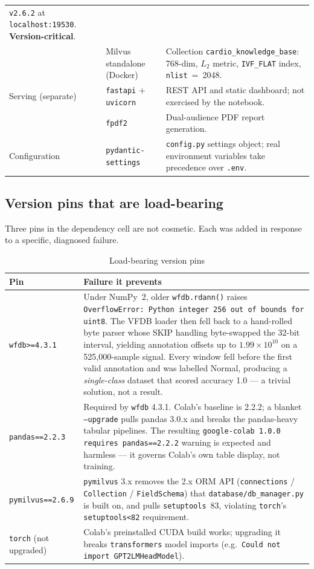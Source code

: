 \documentclass[11pt,a4paper]{article}
\newcommand{\code}[1]{\texttt{\small #1}}
\begin{document}
\begin{longtable}{@{}p{2.9cm}p{4.1cm}p{8.3cm}@{}}
\code{v2.6.2} at \code{localhost:19530}. \textbf{Version-critical}.\\
& Milvus standalone (Docker) & Collection
\code{cardio\_knowledge\_base}: 768-dim, $L_2$ metric, \code{IVF\_FLAT}
index, \code{nlist}~=~2048.\\
\addlinespace
Serving (separate) & \code{fastapi} + \code{uvicorn} & REST API and static
dashboard; not exercised by the notebook.\\
& \code{fpdf2} & Dual-audience PDF report generation.\\
\addlinespace
Configuration & \code{pydantic-settings} & \code{config.py} settings object;
real environment variables take precedence over \code{.env}.\\
\end{longtable}

\subsection{Version pins that are load-bearing}
\label{sec:pins}

Three pins in the dependency cell are not cosmetic. Each was added in
response to a specific, diagnosed failure.

\begin{table}[!ht]
\centering
\caption{Load-bearing version pins}
\label{tab:pins}
\small
\begin{tabular}{@{}p{3.0cm}p{11.8cm}@{}}
\toprule
\textbf{Pin} & \textbf{Failure it prevents}\\
\midrule
\code{wfdb>=4.3.1} &
Under NumPy~2, older \code{wfdb.rdann()} raises
\code{OverflowError: Python integer 256 out of bounds for uint8}. The VFDB
loader then fell back to a hand-rolled byte parser whose SKIP handling
byte-swapped the 32-bit interval, yielding annotation offsets up to
$1.99\times10^{10}$ on a 525{,}000-sample signal. Every window fell before
the first valid annotation and was labelled Normal, producing a
\emph{single-class} dataset that scored accuracy 1.0 --- a trivial
solution, not a result.\\
\addlinespace
\code{pandas==2.2.3} &
Required by \code{wfdb} 4.3.1. Colab's baseline is 2.2.2; a blanket
\code{--upgrade} pulls pandas 3.0.x and breaks the pandas-heavy tabular
pipelines. The resulting
\code{google-colab 1.0.0 requires pandas==2.2.2} warning is expected and
harmless --- it governs Colab's own table display, not training.\\
\addlinespace
\code{pymilvus==2.6.9} &
\code{pymilvus} 3.x removes the 2.x ORM API
(\code{connections} / \code{Collection} / \code{FieldSchema}) that
\code{database/db\_manager.py} is built on, and pulls
\code{setuptools}~83, violating \code{torch}'s \code{setuptools<82}
requirement.\\
\addlinespace
\code{torch} (not upgraded) &
Colab's preinstalled CUDA build works; upgrading it breaks
\code{transformers} model imports (e.g.\
\code{Could not import GPT2LMHeadModel}).\\
\bottomrule
\end{tabular}
\end{table}
\end{document}
